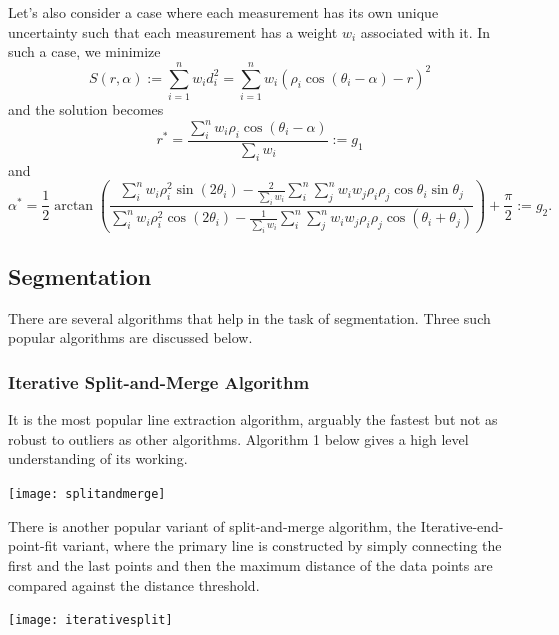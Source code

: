 \documentclass[twoside]{article}
\begin{document}
Let's also consider a case where each measurement has its own unique uncertainty such that each measurement has a weight $w_i$ associated with it. In such a case, we minimize
$$S(r,\alpha) := \sum_{i=1}^n w_id_i^2 = \sum_{i=1}^n w_i(\rho_i \cos(\theta_i - \alpha) - r)^2$$
and the solution becomes \cite{SNS}
$$r^* = \frac{\sum_i^n w_i \rho_i\cos(\theta_i - \alpha)}{\sum_i w_i} := g_1$$ and
$$\alpha^* = \frac{1}{2} \arctan\left(\frac{\sum_i^n w_i \rho_i^2\sin(2\theta_i) - \frac{2}{\sum_i w_i}\sum_i^n\sum_j^n w_i w_j\rho_i \rho_j \cos\theta_i \sin \theta_j}{\sum_i^n w_i \rho_i^2\cos(2\theta_i) - \frac{1}{\sum_i w_i}\sum_i^n\sum_j^n w_i w_j \rho_i \rho_j \cos(\theta_i + \theta_j)}\right) + \frac{\pi}{2} := g_2.$$

\subsection{Segmentation}
There are several algorithms that help in the task of segmentation. Three such popular algorithms are discussed below.

\subsubsection{Iterative Split-and-Merge Algorithm}
It is the most popular line extraction algorithm, arguably the fastest but not as robust to outliers as other algorithms. Algorithm 1 below gives a high level understanding of its working.

\begin{center}
	\texttt{[image: splitandmerge]}
\end{center}

There is another popular variant of split-and-merge algorithm, the Iterative-end-point-fit variant, where the primary line is constructed by simply connecting the first and the last points and then the maximum distance of the data points are compared against the distance threshold.

\begin{center}
	\texttt{[image: iterativesplit]}
\end{center}
\end{document}

